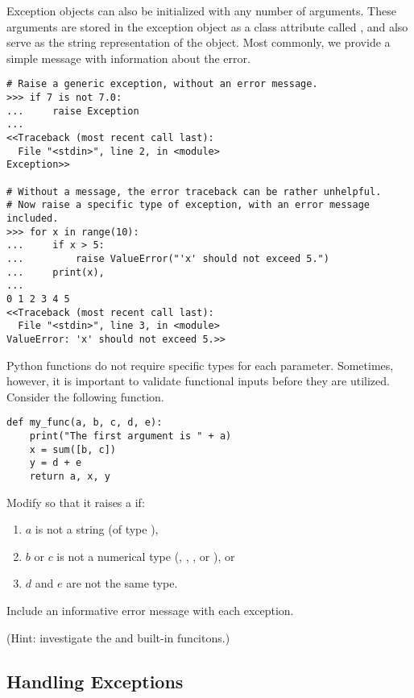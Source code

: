 Exception objects can also be initialized with any number of arguments.
These arguments are stored in the exception object as a class attribute called , and also serve as the string representation of the object.
Most commonly, we provide a simple message with information about the error.

\begin{lstlisting}
# Raise a generic exception, without an error message.
>>> if 7 is not 7.0:
...     raise Exception
... 
<<Traceback (most recent call last):
  File "<stdin>", line 2, in <module>
Exception>>

# Without a message, the error traceback can be rather unhelpful.
# Now raise a specific type of exception, with an error message included.
>>> for x in range(10):
...     if x > 5:
...         raise ValueError("'x' should not exceed 5.")
...     print(x),
... 
0 1 2 3 4 5
<<Traceback (most recent call last):
  File "<stdin>", line 3, in <module>
ValueError: 'x' should not exceed 5.>>
\end{lstlisting}

\begin{problem}
Python functions do not require specific types for each parameter.
Sometimes, however, it is important to validate functional inputs before they are utilized.
Consider the following function.
\begin{lstlisting}
def my_func(a, b, c, d, e):
    print("The first argument is " + a)
    x = sum([b, c])
    y = d + e
    return a, x, y
\end{lstlisting}
Modify  so that it raises a  if:
\begin{enumerate}
\item $a$ is not a string (of type ),
\item $b$ or $c$ is not a numerical type (, , , or ), or
\item $d$ and $e$ are not the same type.
\end{enumerate}
Include an informative error message with each exception.

(Hint: investigate the  and  built-in funcitons.)
\end{problem}

\subsection*{Handling Exceptions}

